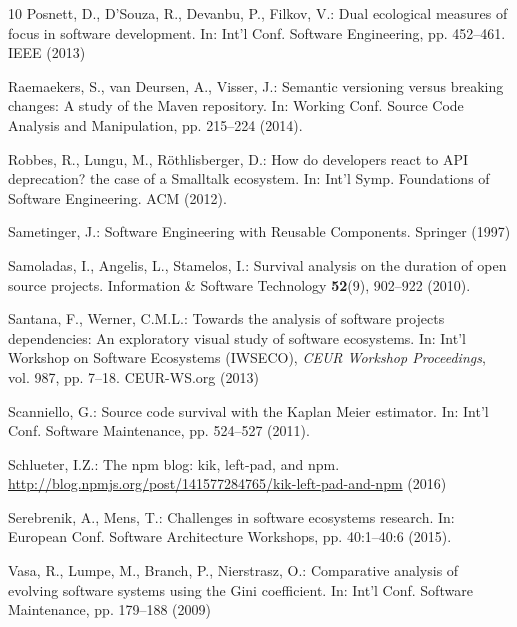 \documentclass[smallextended]{svjour3}       %
\begin{document}
\begin{thebibliography}{10}
Posnett, D., D'Souza, R., Devanbu, P., Filkov, V.: Dual ecological measures of
  focus in software development.
\newblock In: Int'l Conf. Software Engineering, pp. 452--461. {IEEE} (2013)

Raemaekers, S., {van Deursen}, A., Visser, J.: Semantic versioning versus
  breaking changes: A study of the {Maven} repository.
\newblock In: Working Conf. Source Code Analysis and Manipulation, pp. 215--224
  (2014).
\newblock {}

Robbes, R., Lungu, M., R\"{o}thlisberger, D.: How do developers react to {API}
  deprecation? the case of a {Smalltalk} ecosystem.
\newblock In: Int'l Symp. Foundations of Software Engineering. { ACM } (2012).
\newblock {}

Sametinger, J.: Software Engineering with Reusable Components.
\newblock Springer (1997)

Samoladas, I., Angelis, L., Stamelos, I.: Survival analysis on the duration of
  open source projects.
\newblock Information {\&} Software Technology \textbf{52}(9), 902--922 (2010).
\newblock {}

Santana, F., Werner, C.M.L.: Towards the analysis of software projects
  dependencies: An exploratory visual study of software ecosystems.
\newblock In: Int'l Workshop on Software Ecosystems ({IWSECO}), \emph{{CEUR}
  Workshop Proceedings}, vol. 987, pp. 7--18. CEUR-WS.org (2013)

Scanniello, G.: Source code survival with the {Kaplan} {Meier} estimator.
\newblock In: Int'l Conf. Software Maintenance, pp. 524--527 (2011).
\newblock {}

Schlueter, I.Z.: The npm blog: kik, left-pad, and npm.
\newblock \url{http://blog.npmjs.org/post/141577284765/kik-left-pad-and-npm}
  (2016)

Serebrenik, A., Mens, T.: Challenges in software ecosystems research.
\newblock In: European Conf. Software Architecture Workshops, pp. 40:1--40:6
  (2015).
\newblock {}

Vasa, R., Lumpe, M., Branch, P., Nierstrasz, O.: Comparative analysis of
  evolving software systems using the {Gini} coefficient.
\newblock In: Int'l Conf. Software Maintenance, pp. 179--188 (2009)


\end{thebibliography}
\end{document}
